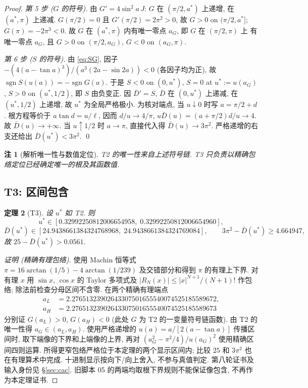 \documentclass[UTF8]{ctexart}
\newtheorem{theorem}{定理}[section]
\newtheorem{remark}[theorem]{注}
\begin{document}
\begin{proof}
\emph{第 5 步 ($G$ 的符号).} 由 $G'=4\sin^2a\,J$: $G$ 在 $(\pi/2,a^*)$ 上递增,
在 $(a^*,\pi)$ 上递减. $G(\pi/2)=0$ 且 $G'(\pi/2)=2\pi^2>0$, 故 $G>0$ on $(\pi/2,a^*]$;
$G(\pi)=-2\pi^3<0$. 故 $G$ 在 $(a^*,\pi)$ 内有唯一零点 $a_G$, 即 $G$ 在 $(\pi/2,\pi)$ 上
有唯一零点 $a_G$, 且 $G>0$ on $(\pi/2,a_G)$, $G<0$ on $(a_G,\pi)$.

\emph{第 6 步 ($S$ 的符号).} 由 \eqref{eq:SG}, 因子 $-(4(a-\tan a)^3)/(a^3(2a-\sin2a))<0$
(各因子均为正), 故 $\operatorname{sgn}S(u(a))=-\operatorname{sgn}G(a)$. 于是
$S<0$ on $(0,u^*)$, $S=0$ at $u^*:=u(a_G)$, $S>0$ on $(u^*,1/2)$,
即 $S$ 由负变正. 因 $\bar D'=S$, $\bar D$ 在 $(0,u^*)$ 上递减, 在 $(u^*,1/2)$ 上递增,
故 $u^*$ 为全局严格极小. 为核对端点, 当 $u\downarrow0$ 时写 $a=\pi/2+d$.
根方程等价于 $a\tan d=u/\ell$, 因而 $d/u\to4/\pi$,
$u\bar D(u)=(a+\pi/2)d/u\to4$. 故 $\bar D(u)\to+\infty$.
当 $u\uparrow1/2$ 时 $a\to\pi$, 直接代入得 $\bar D(u)\to3\pi^2$.
严格递增的右支还给出 $\bar D(u^*)<3\pi^2$. \qed
\end{proof}

\begin{remark}[解析唯一性与数值定位]
T2 的唯一性来自上述符号链. T3 只负责以精确包络定位已经确定唯一的根及其函数值.
\end{remark}

\subsection{T3: 区间包含}\label{sec:T3}
\begin{theorem}[T3]\label{thm:T3}
设 $u^*$ 如 T2. 则
\begin{equation}
	u^*\in[0.32992250812006654958,\;0.32992250812006654960],
\end{equation}
\begin{equation}
	\bar D(u^*)\in[24.9438661384324768968,\;24.9438661384324769084],
	\qquad
	3\pi^2-\bar D(u^*)\ge4.664947,
\end{equation}
故 $25-\bar D(u^*)>0.0561$.
\end{theorem}
\begin{proof}[证明 (精确有理包络)]
使用 Machin 恒等式
$\pi=16\arctan(1/5)-4\arctan(1/239)$ 及交错部分和得到 $\pi$ 的有理上下界.
对有理 $x$ 用 $\sin x$, $\cos x$ 的 Taylor 多项式及
$|R_N(x)|\le |x|^{N+1}/(N+1)!$ 作包络; 除法前检查分母区间不含零.
在两个精确有理端点
\begin{align*}
 a_L&=2.27651323902643307501655540074525185589672,\\
 a_H&=2.27651323902643307501655540074525185589673
\end{align*}
分别证 $G(a_L)>0$, $G(a_H)<0$ (此处 $G$ 为 T2 的一变量符号链函数).
由 T2 的唯一性得 $a_G\in(a_L,a_H)$. 使用严格递增的
$u(a)=a/[2(a-\tan a)]$ 传播区间时, 取下端像的下界和上端像的上界,
再对 $(a_G^2-\pi^2/4)/u(a_G)^2$ 使用精确区间四则运算.
所得更窄包络严格位于本定理的两个显示区间内; 比较 $25$ 和 $3\pi^2$
也在有理算术中完成. 十进制显示按向下/向上舍入, 不参与真值判定.
第八轮证书及输入身份见 §\ref{sec:cac}.
旧脚本 05 的两端均取根下界规则不能保证像包含, 不再作为本定理证书.
\end{proof}
\end{document}
